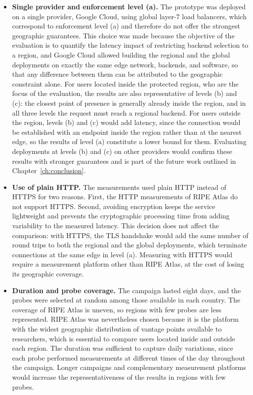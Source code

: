 \begin{itemize}
    \item \textbf{Single provider and enforcement level (a).} The prototype was deployed on a single provider, Google Cloud, using global layer-7 load balancers, which correspond to enforcement level (a) and therefore do not offer the strongest geographic guarantees. This choice was made because the objective of the evaluation is to quantify the latency impact of restricting backend selection to a region, and Google Cloud allowed building the regional and the global deployments on exactly the same edge network, backends, and software, so that any difference between them can be attributed to the geographic constraint alone. For users located inside the protected region, who are the focus of the evaluation, the results are also representative of levels (b) and (c): the closest point of presence is generally already inside the region, and in all three levels the request must reach a regional backend. For users outside the region, levels (b) and (c) would add latency, since the connection would be established with an endpoint inside the region rather than at the nearest edge, so the results of level (a) constitute a lower bound for them. Evaluating deployments at levels (b) and (c) on other providers would confirm these results with stronger guarantees and is part of the future work outlined in Chapter~\ref{ch:conclusion}.

    \item \textbf{Use of plain HTTP.} The measurements used plain HTTP instead of HTTPS for two reasons. First, the HTTP measurements of RIPE Atlas do not support HTTPS. Second, avoiding encryption keeps the service lightweight and prevents the cryptographic processing time from adding variability to the measured latency. This decision does not affect the comparison: with HTTPS, the TLS handshake would add the same number of round trips to both the regional and the global deployments, which terminate connections at the same edge in level (a). Measuring with HTTPS would require a measurement platform other than RIPE Atlas, at the cost of losing its geographic coverage.

    \item \textbf{Duration and probe coverage.} The campaign lasted eight days, and the probes were selected at random among those available in each country. The coverage of RIPE Atlas is uneven, so regions with few probes are less represented. RIPE Atlas was nevertheless chosen because it is the platform with the widest geographic distribution of vantage points available to researchers, which is essential to compare users located inside and outside each region. The duration was sufficient to capture daily variations, since each probe performed measurements at different times of the day throughout the campaign. Longer campaigns and complementary measurement platforms would increase the representativeness of the results in regions with few probes.


\end{itemize}

